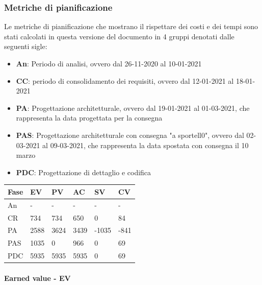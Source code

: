 \subsubsection{Metriche di pianificazione}
    Le metriche di pianificazione che mostrano il rispettare dei costi e dei tempi sono stati calcolati in questa versione del documento in 4 gruppi denotati dalle seguenti sigle:
    \begin{itemize}
        \item \textbf{An}: Periodo di analisi, ovvero dal 26-11-2020 al 10-01-2021
        \item \textbf{CC}: periodo di consolidamento dei requisiti, ovvero dal 12-01-2021 al 18-01-2021
        \item \textbf{PA}: Progettazione architetturale, ovvero dal 19-01-2021 al 01-03-2021, che rappresenta la data progettata per la consegna
        \item \textbf{PAS}: Progettazione architetturale con consegna "a sportell0", ovvero dal 02-03-2021 al 09-03-2021, che rappresenta la data spostata con consegna il 10 marzo
        \item \textbf{PDC}: Progettazione di dettaglio e codifica
    \end{itemize}
    
    
    \begin{longtabu} to \textwidth {| X[0.1,c m] | X[0.1,c m]| X[0.1,c m]| X[0.1,c m]| X[0.1,c m]| X[0.1,c m] |}
        \hline
        \textbf{Fase} &
        \textbf{EV} &
        \textbf{PV} &
        \textbf{AC} &
        \textbf{SV} &
        \textbf{CV} \\
        \hline
        An & - & - & - & - & -  \\ 
        \hline
        CR & 734 & 734 & 650 & 0 & 84 \\
        \hline
        PA & 2588 & 3624 & 3439 & -1035 & -841\\
        \hline
        PAS & 1035 & 0 & 966 & 0 & 69 \\
        \hline
        PDC & 5935 & 5935 & 5935 & 0 & 69 \\
        \hline 
        \end{longtabu}

        \paragraph{Earned value - EV}

